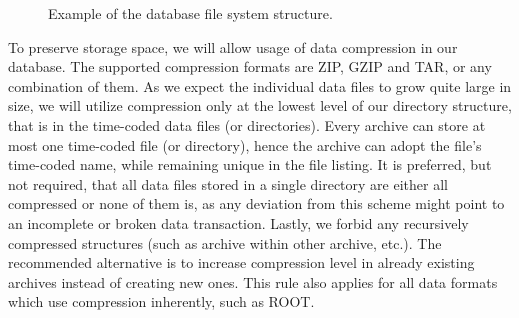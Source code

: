 \begin{figure}[t]
\begin{center}


\caption{Example of the database file system structure.}
\label{fig:db-structure}
\end{center}
\end{figure}


To preserve storage space, we will allow usage of data compression in our database. The supported compression formats are ZIP, GZIP and TAR, or any combination of them. As we expect the individual data files to grow quite large in size, we will utilize compression only at the lowest level of our directory structure, that is in the time-coded data files (or directories). Every archive can store at most one time-coded file (or directory), hence the archive can adopt the file's time-coded name, while remaining unique in the file listing. It is preferred, but not required, that all data files stored in a single directory are either all compressed or none of them is, as any deviation from this scheme might point to an incomplete or broken data transaction. Lastly, we forbid any recursively compressed structures (such as archive within other archive, etc.). The recommended alternative is to increase compression level in already existing archives instead of creating new ones. This rule also applies for all data formats which use compression inherently, such as ROOT.


